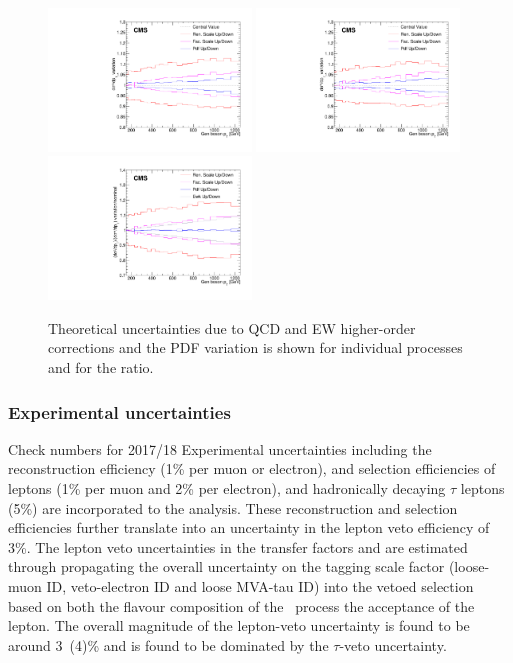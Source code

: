 \begin{figure}[htb!]
  \begin{center}
    \includegraphics[width=0.48\textwidth]{fig/theory/zratio_unc.pdf}
    \includegraphics[width=0.48\textwidth]{fig/theory/wratio_unc.pdf}\\
    \includegraphics[width=0.48\textwidth]{fig/theory/bosonpt_ratio_uncertainty.pdf}
    \caption{Theoretical uncertainties due to QCD and EW higher-order corrections and the PDF variation is shown for individual processes and for the ratio.}
    \label{fig:theory_unc}        
  \end{center}                               
\end{figure}                                 

\subsubsection{Experimental uncertainties}
{\color{red} Check numbers for 2017/18}
Experimental uncertainties including the reconstruction efficiency 
(1\% per muon or electron), and selection efficiencies of leptons 
(1\% per muon and 2\% per electron), and hadronically 
decaying $\tau$ leptons (5\%) are incorporated to the analysis. 
These reconstruction and selection efficiencies further translate into an 
uncertainty in the lepton veto efficiency of 3\%. The lepton veto uncertainties in the transfer 
factors and are estimated through propagating the
overall uncertainty on the tagging scale factor (loose-muon ID, 
veto-electron ID and loose MVA-tau ID) into the vetoed selection 
based on both the flavour composition of the \Wjets~process the acceptance of the lepton. 
The overall magnitude of the lepton-veto uncertainty is found to be around 3~(4)\% 
and is found to be dominated by the $\tau$-veto uncertainty. 


